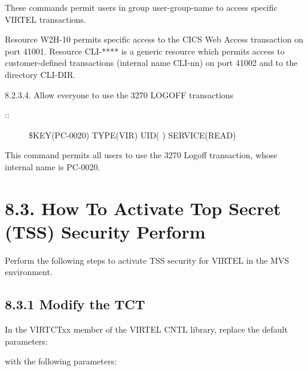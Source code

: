 \documentclass[letterpaper,10pt,english]{sphinxmanual}
\begin{document}
These commands permit users in group user-group-name to access specific VIRTEL transactions.

Resource W2H-10 permits specific access to the CICS Web Access transaction on port 41001. Resource CLI-**** is a generic resource which permits access to customer-defined transactions (internal name CLI-nn) on port 41002 and to the directory CLI-DIR.

8.2.3.4. Allow everyone to use the 3270 LOGOFF transactions
\begin{description}
\item[{::}] \leavevmode
\$KEY(PC-0020) TYPE(VIR) UID(\sphinxstylestrong{****} \sphinxstylestrong{****}) SERVICE(READ)

\end{description}


This command permits all users to use the 3270 Logoff transaction, whose internal name is PC-0020.


\section{8.3. How To Activate Top Secret (TSS) Security Perform}
\label{\detokenize{Installation_Guide:how-to-activate-top-secret-tss-security-perform}}
Perform the following steps to activate TSS security for VIRTEL in the MVS environment.


\subsection{8.3.1 Modify the TCT}
\label{\detokenize{Installation_Guide:modify-the-tct}}
In the VIRTCTxx member of the VIRTEL CNTL library, replace the default parameters:

\begin{sphinxVerbatim}[commandchars=\\\{\}]
\end{sphinxVerbatim}

with the following parameters:

\begin{sphinxVerbatim}[commandchars=\\\{\}]
\end{sphinxVerbatim}
\end{document}
